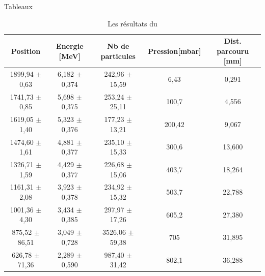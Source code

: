 \documentclass[a4paper,11pt,liststotocnumbered,bibtotocnumbered]{scrartcl}
\begin{document}
\begin{appendix}
\begin{section}{Tableaux}
   \begin{table}[H]
    \begin{center}
     \begin{tabular}{c|c|c|c|c}
      Position			&Energie [MeV]		&Nb de particules	&Pression[mbar]		&Dist. parcouru [mm]\\ \hline
      1899,94 $\pm$ 0,63	&6,182 $\pm$ 0,374	&242,96 $\pm$ 15,59	&6,43	&0,291\\
      1741,73 $\pm$ 0,85	&5,698 $\pm$ 0,375	&253,24 $\pm$ 25,11	&100,7	&4,556\\
      1619,05 $\pm$ 1,40	&5,323 $\pm$ 0,376	&177,23 $\pm$ 13,21	&200,42	&9,067\\
      1474,60 $\pm$ 1,61	&4,881 $\pm$ 0,377	&235,10 $\pm$ 15,33	&300,6	&13,600\\
      1326,71 $\pm$ 1,59	&4,429 $\pm$ 0,377	&226,68 $\pm$ 15,06	&403,7	&18,264\\
      1161,31 $\pm$ 2,08	&3,923 $\pm$ 0,378	&234,92 $\pm$ 15,32	&503,7	&22,788\\
      1001,36 $\pm$ 4,30	&3,434 $\pm$ 0,385	&297,97 $\pm$ 17,26	&605,2	&27,380\\
      875,52 $\pm$ 86,51	&3,049 $\pm$ 0,728	&3526,06 $\pm$ 59,38	&705	&31,895\\
      626,78 $\pm$ 71,36	&2,289 $\pm$ 0,590	&987,40 $\pm$ 31,42	&802,1	&36,288\\
     \end{tabular}
    \caption{\label{tabelle-bi} Les résultats du  }
    \end{center}
   \end{table}
 

\end{section}
\end{appendix}
\end{document}
